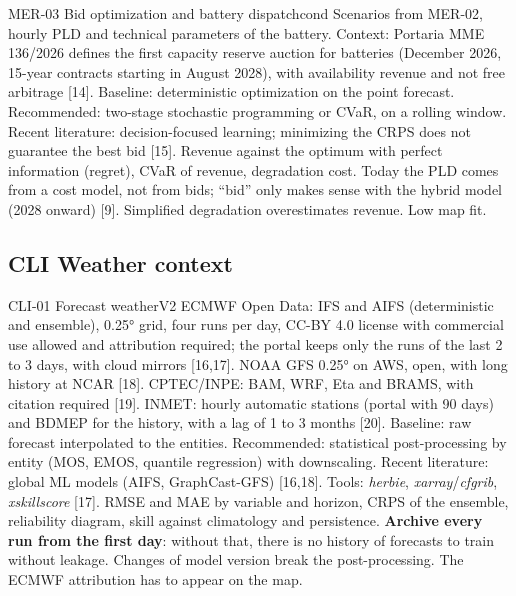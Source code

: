\begin{ficha}{MER-03 \textperiodcentered{} Bid optimization and battery dispatch}{cond}
 Scenarios from MER-02, hourly PLD and technical parameters of the
battery. Context: Portaria MME 136/2026 defines the first capacity reserve
auction for batteries (December 2026, 15-year contracts starting
in August 2028), with availability revenue and not free arbitrage
[14].
 Baseline: deterministic optimization on the point
forecast. Recommended: two-stage stochastic programming or CVaR,
on a rolling window. Recent literature: decision-focused learning; minimizing the
CRPS does not guarantee the best bid [15].
 Revenue against the optimum with perfect information (regret),
CVaR of revenue, degradation cost.
 Today the PLD comes from a cost model, not from bids; ``bid''
only makes sense with the hybrid model (2028 onward) [9]. Simplified
degradation overestimates revenue. Low map fit.
\end{ficha}

\subsection{CLI \textperiodcentered{} Weather context}

\begin{ficha}{CLI-01 \textperiodcentered{} Forecast weather}{V2}
 ECMWF Open Data: IFS and AIFS (deterministic and ensemble), 0.25°
grid, four runs per day, CC-BY 4.0 license with commercial use
allowed and attribution required; the portal keeps only the runs of the
last 2 to 3 days, with cloud mirrors [16,17]. NOAA GFS 0.25° on AWS,
open, with long history at NCAR [18]. CPTEC/INPE: BAM, WRF, Eta and BRAMS,
with citation required [19]. INMET: hourly automatic stations (portal with
90 days) and BDMEP for the history, with a lag of 1 to 3 months [20].
 Baseline: raw forecast interpolated to the
entities. Recommended: statistical post-processing by entity (MOS,
EMOS, quantile regression) with downscaling. Recent literature: global ML
models (AIFS, GraphCast-GFS) [16,18]. Tools: \emph{herbie},
\emph{xarray}/\emph{cfgrib}, \emph{xskillscore} [17].
 RMSE and MAE by variable and horizon, CRPS of the ensemble,
reliability diagram, skill against climatology and persistence.
 \textbf{Archive every run from the first day}: without
that, there is no history of forecasts to train without leakage. Changes of
model version break the post-processing. The ECMWF attribution has to
appear on the map.
\end{ficha}

